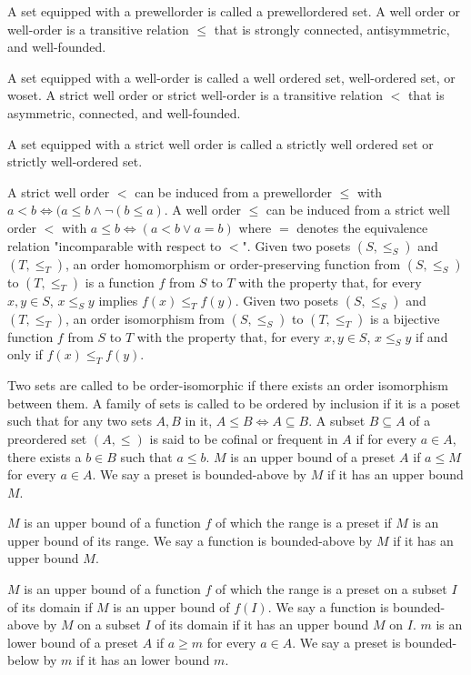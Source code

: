 \documentclass[a4paper,12pt]{article}
\begin{document}
A set equipped with a prewellorder is called a prewellordered set.
A well order or well-order is a transitive relation $\leq$ that is strongly connected, antisymmetric, and well-founded.

A set equipped with a well-order is called a well ordered set, well-ordered set, or woset.
A strict well order or strict well-order is a transitive relation $<$ that is asymmetric, connected, and well-founded.

A set equipped with a strict well order is called a strictly well ordered set or strictly well-ordered set.

A strict well order $<$ can be induced from a prewellorder $\leq$ with $a<b\iff(a\leq b\land \neg(b\leq a)$. A well order $\leq$ can be induced from a strict well order $<$ with $a\leq b\iff(a<b\lor a=b)$ where $=$ denotes the equivalence relation "incomparable with respect to $<$".
Given two posets $(S,\leq _{S})$ and $(T,\leq _{T})$, an order homomorphism or order-preserving function from $(S,\leq _{S})$ to $(T,\leq _{T})$ is a function $f$ from $S$ to $T$ with the property that, for every $x,y\in S$, $x \leq_S y$ implies $f(x)\leq _{T}f(y)$.
Given two posets $(S,\leq _{S})$ and $(T,\leq _{T})$, an order isomorphism from $(S,\leq _{S})$ to $(T,\leq _{T})$ is a bijective function $f$ from $S$ to $T$ with the property that, for every $x,y\in S$, $x \leq_S y$ if and only if $f(x)\leq _{T}f(y)$.

Two sets are called to be order-isomorphic if there exists an order isomorphism between them.
A family of sets is called to be ordered by inclusion if it is a poset such that for any two sets $A,B$ in it, $A\leq B\iff A\subseteq B$.
A subset $B\subseteq A$ of a preordered set $(A,\leq )$ is said to be cofinal or frequent in $A$ if for every $a\in A$, there exists a $b\in B$ such that $a\leq b$.
$M$ is an upper bound of a preset $A$ if $a\leq M$ for every $a\in A$. We say a preset is bounded-above by $M$ if it has an upper bound $M$.

$M$ is an upper bound of a function $f$ of which the range is a preset if $M$ is an upper bound of its range. We say a function is bounded-above by $M$ if it has an upper bound $M$.

$M$ is an upper bound of a function $f$ of which the range is a preset on a subset $I$ of its domain if $M$ is an upper bound of $f(I)$. We say a function is bounded-above by $M$ on a subset $I$ of its domain if it has an upper bound $M$ on $I$.
$m$ is an lower bound of a preset $A$ if $a\geq m$ for every $a\in A$. We say a preset is bounded-below by $m$ if it has an lower bound $m$.
\end{document}
